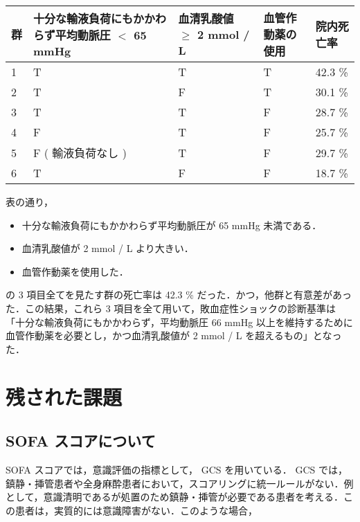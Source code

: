 \documentclass[10pt,uplatex]{jsarticle}
\begin{document}
\begin{table}[htb]
\begin{center}
\begin{tabular}{|p{1cm}|p{3cm}|p{3cm}|p{3cm}|p{3cm}|}  \hline

群 & 十分な輸液負荷にもかかわらず平均動脈圧 $<$ 65 mmHg & 血清乳酸値 $\geq$ 2 mmol / L & 血管作動薬の使用 & 院内死亡率 \\ \hline
1 & T & T & T & 42.3 \% \\ \hline
2 & T & F & T & 30.1 \% \\ \hline
3 & T & T & F & 28.7 \% \\ \hline
4 & F & T & F & 25.7 \% \\ \hline
5 & F ( 輸液負荷なし ) & T & F & 29.7 \% \\ \hline
6 & T & F & F & 18.7 \% \\ \hline

\end{tabular}
\end{center}
\end{table}


表の通り，

\begin{itemize}
\item 十分な輸液負荷にもかかわらず平均動脈圧が 65 mmHg 未満である．
\item 血清乳酸値が 2 mmol / L より大きい．
\item 血管作動薬を使用した．
\end{itemize}

の 3 項目全てを見たす群の死亡率は 42.3 \% だった．かつ，他群と有意差があった．この結果，これら 3 項目を全て用いて，敗血症性ショックの診断基準は「十分な輸液負荷にもかかわらず，平均動脈圧 66 mmHg 以上を維持するために血管作動薬を必要とし，かつ血清乳酸値が 2 mmol / L を超えるもの」となった．

\section{残された課題}

\subsection{SOFA スコアについて}

SOFA スコアでは，意識評価の指標として， GCS を用いている． GCS では，鎮静・挿管患者や全身麻酔患者において，スコアリングに統一ルールがない．例として，意識清明であるが処置のため鎮静・挿管が必要である患者を考える．この患者は，実質的には意識障害がない．このような場合，
\end{document}
